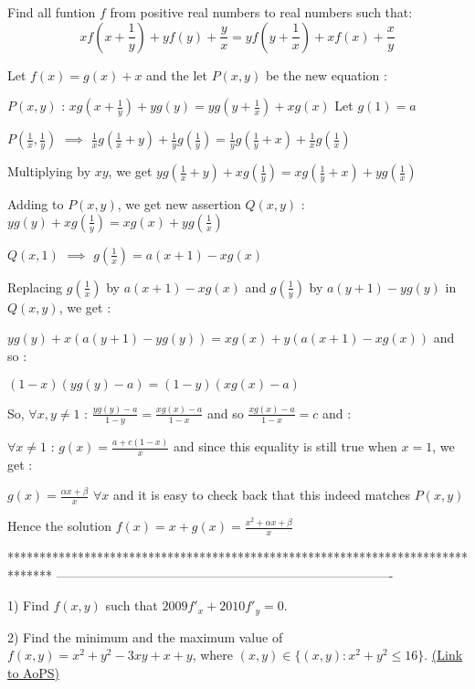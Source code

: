\begin{solution}
	\begin{tcolorbox}Find all funtion $ f$ from positive real numbers to real numbers such that:
\[ xf\left (x + \frac {1}{y}\right ) + yf(y) + \frac {y}{x} = yf\left (y + \frac {1}{x}\right ) + xf(x) + \frac {x}{y}\]
\end{tcolorbox}

Let $ f(x) = g(x) + x$ and the let $ P(x,y)$ be the new equation :

$ P(x,y)$ : $ xg(x + \frac 1y) + yg(y) = yg(y + \frac 1x) + xg(x)$
Let $ g(1) = a$

$ P(\frac 1x,\frac 1y)$ $ \implies$ $ \frac 1xg(\frac 1x + y) + \frac 1yg(\frac 1y) = \frac 1yg(\frac 1y + x) + \frac 1xg(\frac 1x)$

Multiplying by $ xy$, we get $ yg(\frac 1x + y) + xg(\frac 1y) = xg(\frac 1y + x) + yg(\frac 1x)$

Adding to $ P(x,y)$, we get new assertion $ Q(x,y)$ : $ yg(y) + xg(\frac 1y) = xg(x) + yg(\frac 1x)$

$ Q(x,1)$ $ \implies$ $ g(\frac 1x) = a(x + 1) - xg(x)$

Replacing $ g(\frac 1x)$ by $ a(x + 1) - xg(x)$ and $ g(\frac 1y)$ by $ a(y + 1) - yg(y)$ in $ Q(x,y)$, we get :

$ yg(y) + x(a(y + 1) - yg(y)) = xg(x) + y(a(x + 1) - xg(x))$ and so :

$ (1 - x)(yg(y) - a) = (1 - y)(xg(x) - a)$ 

So, $ \forall x,y\ne 1$ : $ \frac {yg(y) - a}{1 - y} = \frac {xg(x) - a}{1 - x}$ and so $ \frac {xg(x) - a}{1 - x} = c$ and :

$ \forall x\ne 1$ : $ g(x) = \frac {a + c(1 - x)}x$ and since this equality is still  true when $ x = 1$, we get :

$ g(x) = \frac {\alpha x + \beta}x$ $ \forall x$ and it is easy to check back that this indeed matches $ P(x,y)$

Hence the solution $ f(x) = x + g(x) = \boxed{\frac {x^2 + \alpha x + \beta}x}$
\end{solution}
*******************************************************************************
-------------------------------------------------------------------------------

\begin{problem}
	1) Find $ f(x,y)$ such that $ 2009 f'_{x}+2010 f'_{y}=0$.

2) Find the minimum and the maximum value of $ f(x,y)=x^2+y^2-3xy+x+y$, where $ (x,y)\in \{(x,y): x^2+y^2\leq 16\}$.
	\flushright \href{https://artofproblemsolving.com/community/c6h321431}{(Link to AoPS)}
\end{problem}



